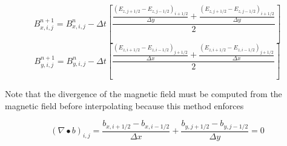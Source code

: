 \documentclass[11pt]{article}
\begin{document}
\begin{equation}
	B_{x,i,j}^{n+1} = B_{x,i,j}^{n} - 
	\Delta t
	\left[
	\frac{\frac{(E_{z,j+1/2}-E_{z,j-1/2})_{i+1/2}}{\Delta y} 
	+
	\frac{(E_{z,j+1/2}-E_{z,j-1/2})_{i+1/2}}{\Delta y}}{2}
	\right]
\end{equation}
\begin{equation}
	B_{y,i,j}^{n+1} = B_{y,i,j}^{n} - 
	\Delta t
	\left[
	\frac{\frac{(E_{z,i+1/2}-E_{z,i-1/2})_{j+1/2}}{\Delta x} 
	+
	\frac{(E_{z,i+1/2}-E_{z,i-1/2})_{j+1/2}}{\Delta x}}{2}
	\right]
\end{equation}

Note that the divergence of the magnetic field must be computed from the magnetic field before interpolating because this method enforces

\begin{equation}
	(\nabla \bullet b)_{i,j} = 
	\frac{b_{x,i+1/2}-b_{x,i-1/2}}{\Delta x}
	+
	\frac{b_{y,j+1/2}-b_{y,j-1/2}}{\Delta y}
	=
	0
\end{equation}
\end{document}
